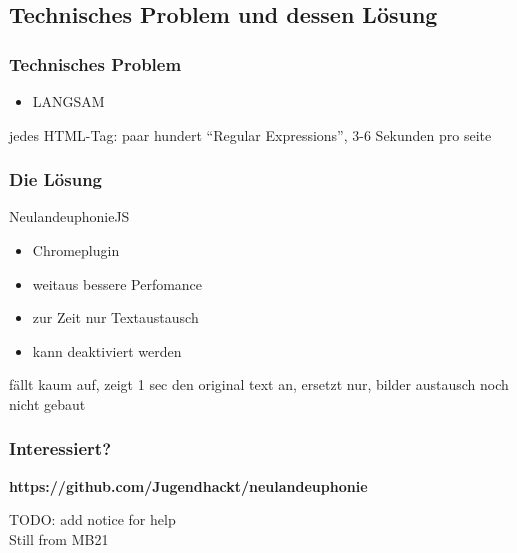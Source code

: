 \documentclass [xcolor=dvipsnames] {beamer}
\begin{document}
\subsection{Technisches Problem und dessen Lösung}
\begin{frame}
	\frametitle{\sc Technisches Problem}
	\begin{center}
		\begin{itemize}
			\item LANGSAM
		\end{itemize}
	\end{center}
\end{frame}
\note
{
	{\Large jedes HTML-Tag: paar hundert "`Regular Expressions"', 3-6 Sekunden pro seite}
	
}
\begin{frame}
	\frametitle{\sc Die Lösung}
	\begin{center}
		{\Large NeulandeuphonieJS}
	\end{center}
	\begin{itemize}
		\item Chromeplugin
		\item weitaus bessere Perfomance
		\item zur Zeit nur Textaustausch
		\item kann deaktiviert werden
	\end{itemize}
\end{frame}
\note
{
	{\Large fällt kaum auf, zeigt 1 sec den original text an, ersetzt nur, bilder austausch noch nicht gebaut}
	
}
\begin{frame}
	\frametitle{\sc Interessiert?}
	\begin{center}
		{\bf https://github.com/Jugendhackt/neulandeuphonie}
	\end{center}
\end{frame}
\note
{
	{\Large TODO: add notice for help}
	\\
	Still from MB21
}

\begin{frame}
	\titlepage
\end{frame}
\end{document}
